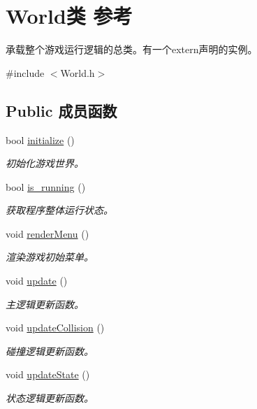 \hypertarget{class_world}{}\section{World类 参考}
\label{class_world}


承载整个游戏运行逻辑的总类。有一个extern声明的实例。  




{\ttfamily \#include $<$World.\+h$>$}

\subsection*{Public 成员函数}
\begin{DoxyCompactItemize}
\item 
bool \hyperlink{class_world_ae75511e9504917690bc4ab1421cff6d5}{initialize} ()
\begin{DoxyCompactList}\small\item\em 初始化游戏世界。 \end{DoxyCompactList}\item 
bool \hyperlink{class_world_ad15782e0eaf62c5ab4fcd3620e2c866a}{is\+\_\+running} ()
\begin{DoxyCompactList}\small\item\em 获取程序整体运行状态。 \end{DoxyCompactList}\item 
void \hyperlink{class_world_af956580b52927299a0bf200740f8ea0d}{render\+Menu} ()
\begin{DoxyCompactList}\small\item\em 渲染游戏初始菜单。 \end{DoxyCompactList}\item 
void \hyperlink{class_world_aac8c1fde63c06577ffc648aaefdb37f0}{update} ()
\begin{DoxyCompactList}\small\item\em 主逻辑更新函数。 \end{DoxyCompactList}\item 
void \hyperlink{class_world_ab86ffcea335fe909467eb754edc5f1a5}{update\+Collision} ()
\begin{DoxyCompactList}\small\item\em 碰撞逻辑更新函数。 \end{DoxyCompactList}\item 
void \hyperlink{class_world_a6a1abe665fc8056caf3dd84663bccfb8}{update\+State} ()
\begin{DoxyCompactList}\small\item\em 状态逻辑更新函数。 \end{DoxyCompactList}\item 

\end{DoxyCompactItemize}
